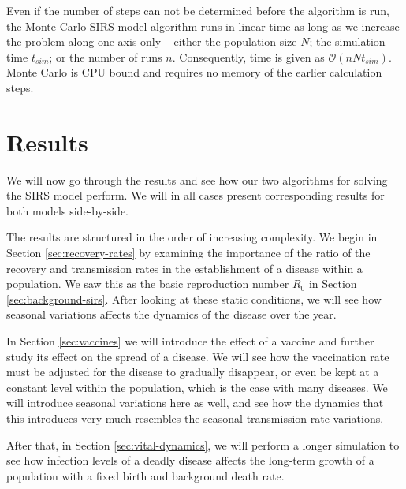 \documentclass[]{article}
\begin{document}
Even if the number of steps can not be determined before the algorithm is run, the Monte Carlo SIRS model algorithm runs in linear time as long as we increase the problem along one axis only -- either the population size $N$; the simulation time $t_{sim}$; or the number of runs $n$. Consequently, time is given as $\mathcal{O}(nNt_{sim})$. Monte Carlo is CPU bound and requires no memory of the earlier calculation steps.


\section{Results} \label{sec:results}

We will now go through the results and see how our two algorithms for solving the SIRS model perform. We will in all cases present corresponding results for both models side-by-side. 

The results are structured in the order of increasing complexity. We begin in Section \ref{sec:recovery-rates} by examining the importance of the ratio of the recovery and transmission rates in the establishment of a disease within a population. We saw this as the basic reproduction number $R_0$ in Section \ref{sec:background-sirs}. After looking at these static conditions, we will see how seasonal variations affects the dynamics of the disease over the year.

In Section \ref{sec:vaccines} we will introduce the effect of a vaccine and further study its effect on the spread of a disease. We will see how the vaccination rate must be adjusted for the disease to gradually disappear, or even be kept at a constant level within the population, which is the case with many diseases. We will introduce seasonal variations here as well, and see how the dynamics that this introduces very much resembles the seasonal transmission rate variations.

After that, in Section \ref{sec:vital-dynamics}, we will perform a longer simulation to see how infection levels of a deadly disease affects the long-term growth of a population with a fixed birth and background death rate.
\end{document}
